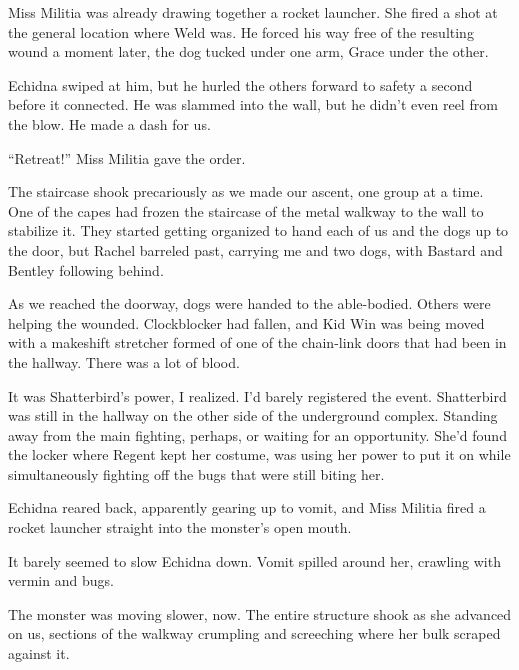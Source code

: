 Miss Militia was already drawing together a rocket launcher.  She fired a shot at the general location where Weld was.  He forced his way free of the resulting wound a moment later, the dog tucked under one arm, Grace under the other.



Echidna swiped at him, but he hurled the others forward to safety a second before it connected.  He was slammed into the wall, but he didn't even reel from the blow.  He made a dash for us.



``Retreat!'' Miss Militia gave the order.



The staircase shook precariously as we made our ascent, one group at a time.  One of the capes had frozen the staircase of the metal walkway to the wall to stabilize it.  They started getting organized to hand each of us and the dogs up to the door, but Rachel barreled past, carrying me and two dogs, with Bastard and Bentley following behind.



As we reached the doorway, dogs were handed to the able-bodied.  Others were helping the wounded.  Clockblocker had fallen, and Kid Win was being moved with a makeshift stretcher formed of one of the chain-link doors that had been in the hallway.  There was a lot of blood.



It was Shatterbird's power, I realized.  I'd barely registered the event.  Shatterbird was still in the hallway on the other side of the underground complex.  Standing away from the main fighting, perhaps, or waiting for an opportunity.  She'd found the locker where Regent kept her costume, was using her power to put it on while simultaneously fighting off the bugs that were still biting her.



Echidna reared back, apparently gearing up to vomit, and Miss Militia fired a rocket launcher straight into the monster's open mouth.



It barely seemed to slow Echidna down.  Vomit spilled around her, crawling with vermin and bugs.



The monster was moving slower, now.  The entire structure shook as she advanced on us, sections of the walkway crumpling and screeching where her bulk scraped against it.



